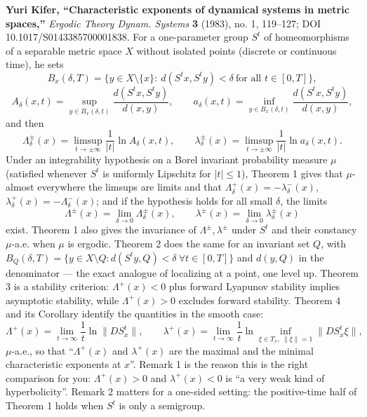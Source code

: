 \documentclass[
]{article}
\begin{document}
\textbf{Yuri Kifer, ``Characteristic exponents of dynamical systems in
metric spaces,''} \emph{Ergodic Theory Dynam. Systems} \textbf{3}
(1983), no. 1, 119--127; DOI 10.1017/S0143385700001838. For a
one-parameter group \(S^t\) of homeomorphisms of a separable metric
space \(X\) without isolated points (discrete or continuous time), he
sets \[
B_x(\delta,T)=\{y\in X\setminus\{x\}:\ d(S^tx,S^ty)<\delta\ \text{for all } t\in[0,T]\},
\] \[
A_\delta(x,t)=\sup_{y\in B_x(\delta,t)}\frac{d(S^tx,S^ty)}{d(x,y)},\qquad
a_\delta(x,t)=\inf_{y\in B_x(\delta,t)}\frac{d(S^tx,S^ty)}{d(x,y)},
\] and then \[
\Lambda^\pm_\delta(x)=\limsup_{t\to\pm\infty}\frac{1}{|t|}\ln A_\delta(x,t),\qquad
\lambda^\pm_\delta(x)=\limsup_{t\to\pm\infty}\frac{1}{|t|}\ln a_\delta(x,t).
\] Under an integrability hypothesis on a Borel invariant probability
measure \(\mu\) (satisfied whenever \(S^t\) is uniformly Lipschitz for
\(|t|\le1\)), Theorem 1 gives that \(\mu\)-almost everywhere the limsups
are limits and that \(\Lambda^+_\delta(x)=-\lambda^-_\delta(x)\),
\(\lambda^+_\delta(x)=-\Lambda^-_\delta(x)\); and if the hypothesis
holds for all small \(\delta\), the limits \[
\Lambda^\pm(x)=\lim_{\delta\to0}\Lambda^\pm_\delta(x),\qquad \lambda^\pm(x)=\lim_{\delta\to0}\lambda^\pm_\delta(x)
\] exist. Theorem 1 also gives the invariance of
\(\Lambda^\pm,\lambda^\pm\) under \(S^t\) and their constancy
\(\mu\)-a.e. when \(\mu\) is ergodic. Theorem 2 does the same for an
invariant set \(Q\), with
\(B_Q(\delta,T)=\{y\in X\setminus Q: d(S^ty,Q)<\delta\ \forall t\in[0,T]\}\)
and \(d(y,Q)\) in the denominator --- the exact analogue of localizing
at a point, one level up. Theorem 3 is a stability criterion:
\(\Lambda^+(x)<0\) plus forward Lyapunov stability implies asymptotic
stability, while \(\Lambda^+(x)>0\) excludes forward stability. Theorem
4 and its Corollary identify the quantities in the smooth case: \[
\Lambda^+(x)=\lim_{t\to\infty}\frac1t\ln\|DS^t_x\|,\qquad
\lambda^+(x)=\lim_{t\to\infty}\frac1t\ln\inf_{\xi\in T_x,\ \|\xi\|=1}\|DS^t_x\xi\|,
\] \(\mu\)-a.e., so that ``\(\Lambda^+(x)\) and \(\lambda^+(x)\) are the
maximal and the minimal characteristic exponents at \(x\)''. Remark 1 is
the reason this is the right comparison for you: \(\Lambda^+(x)>0\) and
\(\lambda^+(x)<0\) is ``a very weak kind of hyperbolicity''. Remark 2
matters for a one-sided setting: the positive-time half of Theorem 1
holds when \(S^t\) is only a semigroup.
\end{document}
